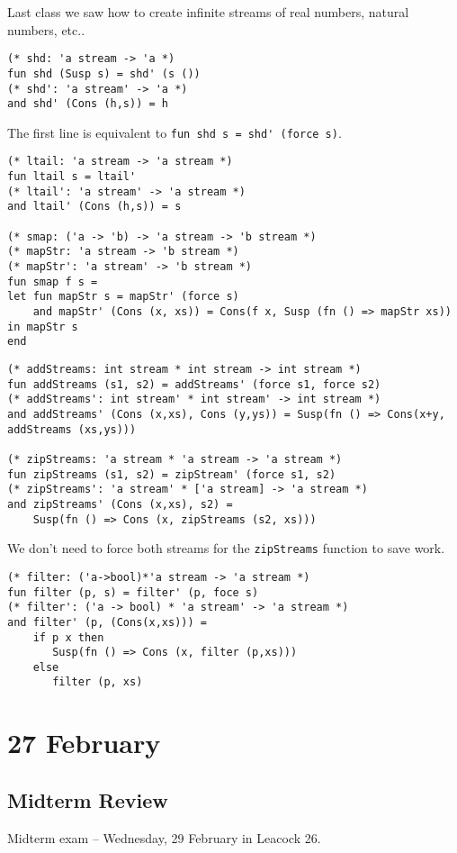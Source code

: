\documentclass[11pt]{article}
\begin{document}
Last class we saw how to create infinite streams of real numbers, natural numbers, etc..

\begin{verbatim}
(* shd: 'a stream -> 'a *)
fun shd (Susp s) = shd' (s ()) 
(* shd': 'a stream' -> 'a *)
and shd' (Cons (h,s)) = h
\end{verbatim}

The first line is equivalent to \verb~fun shd s = shd' (force s)~.

\begin{verbatim}
(* ltail: 'a stream -> 'a stream *)
fun ltail s = ltail' 
(* ltail': 'a stream' -> 'a stream *)
and ltail' (Cons (h,s)) = s

(* smap: ('a -> 'b) -> 'a stream -> 'b stream *)
(* mapStr: 'a stream -> 'b stream *)
(* mapStr': 'a stream' -> 'b stream *)
fun smap f s =
let fun mapStr s = mapStr' (force s)
    and mapStr' (Cons (x, xs)) = Cons(f x, Susp (fn () => mapStr xs))
in mapStr s
end
\end{verbatim}

\begin{verbatim}
(* addStreams: int stream * int stream -> int stream *)
fun addStreams (s1, s2) = addStreams' (force s1, force s2)
(* addStreams': int stream' * int stream' -> int stream *)
and addStreams' (Cons (x,xs), Cons (y,ys)) = Susp(fn () => Cons(x+y, addStreams (xs,ys)))

(* zipStreams: 'a stream * 'a stream -> 'a stream *)
fun zipStreams (s1, s2) = zipStream' (force s1, s2)
(* zipStreams': 'a stream' * ['a stream] -> 'a stream *)
and zipStreams' (Cons (x,xs), s2) =
    Susp(fn () => Cons (x, zipStreams (s2, xs)))
\end{verbatim}

We don't need to force both streams for the \verb~zipStreams~ function to save work.

\begin{verbatim}
(* filter: ('a->bool)*'a stream -> 'a stream *)
fun filter (p, s) = filter' (p, foce s)
(* filter': ('a -> bool) * 'a stream' -> 'a stream *)
and filter' (p, (Cons(x,xs))) = 
    if p x then
       Susp(fn () => Cons (x, filter (p,xs)))
    else
       filter (p, xs)
\end{verbatim}

\section{27 February}
\subsection{Midterm Review}
Midterm exam -- Wednesday, 29 February in Leacock 26.
\end{document}
